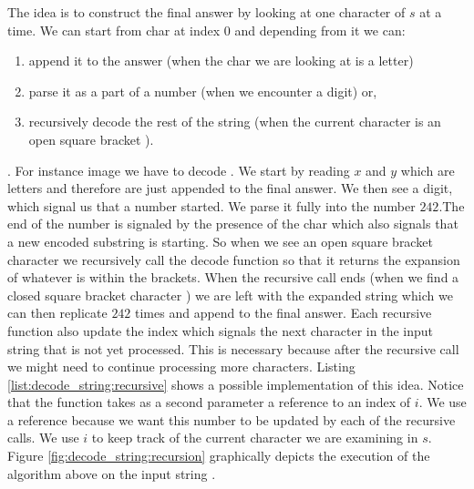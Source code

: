 The idea is to construct the final answer by looking at one character of $s$ at a time. We can start
from char at index $0$ and depending from it we can:
\begin{enumerate}
	\item append it to the answer (when the char we are looking at is a letter)
	\item parse it as a part of a number (when we encounter a digit) or,
	\item recursively decode the rest of the string (when the current character is an open square
bracket \inline{'['}). \end{enumerate}. For instance image we have to decode
. We start by reading $x$ and $y$ which are letters and therefore are
just appended to the final answer. We then see a digit, which signal us that a number started.  We
parse it fully into the number $242$.The end of the number is signaled by the presence of the char
\inline{'['} which also signals that a new encoded substring is starting. So when we see an open
square bracket character we recursively call the decode function so that it returns the expansion of
whatever is within the brackets. When the recursive call ends (when we find a closed square bracket
character \inline{']'}) we are left with the expanded string which we can then replicate $242$ times
and append to the final answer. Each recursive function also update the index which signals the next
character in the input string that is not yet processed. This is necessary because after the
recursive call we might need to continue processing more characters. Listing
\ref{list:decode_string:recursive} shows a possible implementation of this idea. Notice that the
function  takes as a second parameter a reference to an index
of $i$. We use a reference because we want this number to be updated by each of the recursive calls.
We use $i$ to keep track of the current character we are examining in $s$. Figure
\ref{fig:decode_string:recursion} graphically depicts the execution of the algorithm above on the
input string .





